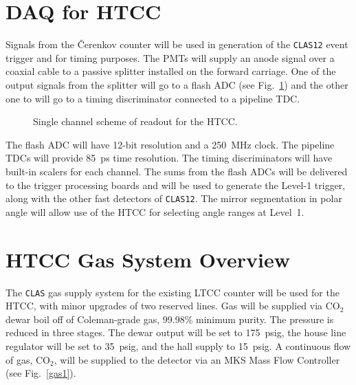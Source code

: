 \section{DAQ for HTCC}

Signals from the {\v C}erenkov counter will be used in generation of 
the {\tt CLAS12} event trigger and for timing purposes.  The PMTs will 
supply an anode signal over a coaxial cable to a passive splitter installed 
on the forward carriage.  One of the output signals from the splitter will go 
to a flash ADC (see Fig.~\ref{singlHTCC}) and the other one to will go
to a timing discriminator connected to a pipeline TDC. 
 
\begin{figure}
\vspace{2.0cm}
\begin{center}
\caption{\small{Single channel scheme of readout for the HTCC.}}
\label{singlHTCC}
\end{center}
\end{figure}

The flash ADC will have 12-bit resolution and a 250~MHz clock. The pipeline 
TDCs will provide 85~ps time resolution.  The timing discriminators will 
have built-in scalers for each channel.  The sums from the flash ADCs will 
be delivered to the trigger processing boards and will be used to generate 
the Level-1 trigger, along with the other fast detectors of {\tt CLAS12}. 
The mirror segmentation in polar angle will allow use of the HTCC for 
selecting angle ranges at Level~1.

\section{HTCC Gas System Overview}
\label{gassystem}

The {\tt CLAS} gas supply system for the existing LTCC counter will be 
used for the HTCC, with minor upgrades of two reserved lines.  Gas will 
be supplied via CO$_2$ dewar boil off of Coleman-grade gas, 99.98\% 
minimum purity.  The pressure is reduced in three stages.  The dewar 
output will be set to 175~psig, the house line regulator will be set to 
35~psig, and the hall supply to 15~psig.  A continuous flow of gas, 
CO$_2$, will be supplied to the detector via an MKS Mass Flow Controller 
(see Fig.~\ref{gas1}).

